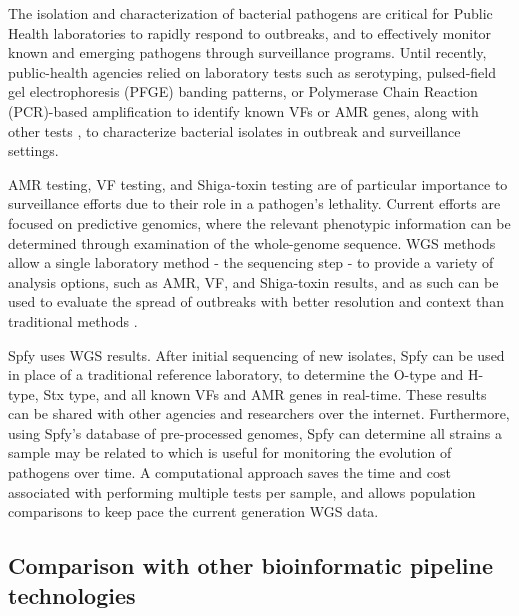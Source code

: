 \documentclass{article}
\begin{document}
The isolation and characterization of bacterial pathogens are critical for Public Health laboratories to rapidly respond to outbreaks, and to effectively monitor known and emerging pathogens through surveillance programs.
Until recently, public-health agencies relied on laboratory tests such as serotyping, pulsed-field gel electrophoresis (PFGE) banding patterns, or Polymerase Chain Reaction (PCR)-based amplification to identify known VFs or AMR genes, along with other tests \cite{ronholm2016navigating}, to characterize bacterial isolates in outbreak and surveillance settings.

AMR testing, VF testing, and Shiga-toxin testing are of particular importance to surveillance efforts due to their role in a pathogen's lethality.
Current efforts are focused on predictive genomics, where the relevant phenotypic information can be determined through examination of the whole-genome sequence.
WGS methods allow a single laboratory method - the sequencing step - to provide a variety of analysis options, such as AMR, VF, and Shiga-toxin results, and as such can be used to evaluate the spread of outbreaks with better resolution and context than traditional methods \cite{ronholm2016navigating}.

Spfy uses WGS results.
After initial sequencing of new isolates, Spfy can be used in place of a traditional reference laboratory, to determine the O-type and H-type, Stx type, and all known VFs and AMR genes in real-time.
These results can be shared with other agencies and researchers over the internet.
Furthermore, using Spfy's database of pre-processed genomes, Spfy can determine all strains a sample may be related to which is useful for monitoring the evolution of pathogens over time.
A computational approach saves the time and cost associated with performing multiple tests per sample, and allows population comparisons to keep pace the current generation WGS data.

\subsection{Comparison with other bioinformatic pipeline technologies}
\end{document}

